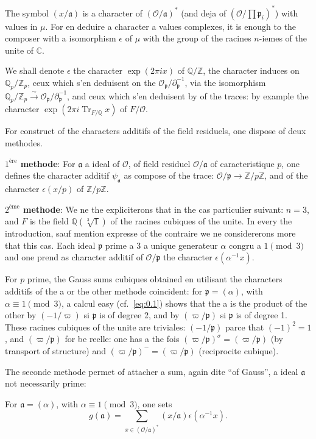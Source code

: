 \documentclass[12pt,a4paper]{article}
\theoremstyle{plain}
\theoremstyle{definition}
\theoremstyle{remark}
\DeclareMathOperator{\Tr}{Tr}
\newcommand{\CC}{\mathbb{C}}
\newcommand{\QQ}{\mathbb{Q}}
\newcommand{\ZZ}{\mathbb{Z}}
\newcommand{\cO}{\mathcal{O}}
\newcommand{\frakp}{\mathfrak{p}}
\newcommand{\fraka}{\mathfrak{a}}
\providecommand{\CC}{\mathbb{C}}
\providecommand{\QQ}{\mathbb{Q}}
\providecommand{\ZZ}{\mathbb{Z}}
\providecommand{\cO}{\mathcal{O}}
\providecommand{\fraka}{\mathfrak{a}}
\providecommand{\frakp}{\mathfrak{p}}
\providecommand{\Tr}{\operatorname{Tr}}
\begin{document}
The symbol $(x/\fraka)$ is a character of $(\cO/\fraka)^*$ (and deja of $(\cO/\prod \frakp_i)^*$) with values in $\mu$. For en deduire a character a values complexes, it is enough to the composer with a isomorphism $\epsilon$ of $\mu$ with the group of the racines $n$-iemes of the unite of $\CC$.

We shall denote $\epsilon$ the character $\exp(2\pi i x)$ of $\QQ/\ZZ$, the character induces on $\QQ_p/\ZZ_p$, ceux which s'en deduisent on the $\cO_{\frakp}/\partial_{\frakp}^{-1}$, via the isomorphism $\QQ_p/\ZZ_p \xrightarrow{\sim} \cO_{\frakp}/\partial_{\frakp}^{-1}$, and ceux which s'en deduisent by of the traces: by example the character $\exp(2\pi i \Tr_{F/\QQ} x)$ of $F/\cO$.

For construct of the characters additifs of the field residuels, one dispose of deux methodes.

\textbf{$1^{\text{ère}}$ methode}: For $\fraka$ a ideal of $\cO$, of field residuel $\cO/\fraka$ of caracteristique $p$, one defines the character additif $\psi_{\fraka}$ as compose of the trace: $\cO/\frakp \to \ZZ/p\ZZ$, and of the character $\epsilon(x/p)$ of $\ZZ/p\ZZ$.

\textbf{$2^{\text{ème}}$ methode}: We ne the expliciterons that in the cas particulier suivant: $n = 3$, and $F$ is the field $\QQ(\sqrt[3]{1})$ of the racines cubiques of the unite. In every the introduction, sauf mention expresse of the contraire we ne considererons more that this cas. Each ideal $\frakp$ prime a $3$ a unique generateur $\alpha$ congru a $1 \pmod 3$ and one prend as character additif of $\cO/\frakp$ the character $\epsilon(\alpha^{-1} x)$.

For $p$ prime, the Gauss sums cubiques obtained en utilisant the characters additifs of the a or the other methode coincident: for $\frakp = (\alpha)$, with $\alpha \equiv 1 \pmod 3$, a calcul easy (cf.\ \eqref{eq:0.1}) shows that the a is the product of the other by $(-1/\varpi)$ si $\frakp$ is of degree 2, and by $(\varpi/\frakp)$ si $\frakp$ is of degree 1. These racines cubiques of the unite are triviales: $(-1/\frakp)$ parce that $(-1)^2 = 1$, and $(\varpi/\frakp)$ for be reelle: one has a the fois $(\varpi/\frakp)^\sigma = (\varpi/\frakp)$ (by transport of structure) and $(\varpi/\frakp)^- = (\varpi/\frakp)$ (reciprocite cubique).

The seconde methode permet of attacher a sum, again dite ``of Gauss'', a ideal $\fraka$ not necessarily prime:

For $\fraka = (\alpha)$, with $\alpha \equiv 1 \pmod 3$, one sets
\begin{equation}\label{eq:0.2}
g(\fraka) = \sum_{x \in (\cO/\fraka)^*} (x/\fraka) \epsilon(\alpha^{-1} x).
\tag{0.2}
\end{equation}
\end{document}
